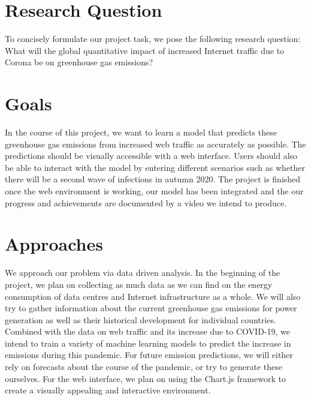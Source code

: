 \documentclass[s=english,inputenc=utf8,fontsize=10pt]{ldvarticle}
\begin{document}
\section*{Research Question}

To concisely formulate our project task, we pose the following research question:
What will the global quantitative impact of increased Internet traffic due to Corona be on greenhouse gas emissions?

\section*{Goals}

In the course of this project, we want to learn a model that predicts these greenhouse gas emissions from increased web traffic as accurately as possible. The predictions should be visually accessible with a web interface. Users should also be able to interact with the model by entering different scenarios such as whether there will be a second wave of infections in autumn 2020. The project is finished once the web environment is working, our model has been integrated and the our progress and achievements are documented by a video we intend to produce.

\section*{Approaches}

We approach our problem via data driven analysis. In the beginning of the project, we plan on collecting as much data as we can find on the energy consumption of data centres and Internet infrastructure as a whole. We will also try to gather information about the current greenhouse gas emissions for power generation as well as their historical development for individual countries. Combined with the data on web traffic and its increase due to COVID-19, we intend to train a variety of machine learning models to predict the increase in emissions during this pandemic. For future emission predictions, we will either rely on forecasts about the course of the pandemic, or try to generate these ourselves.
For the web interface, we plan on using the Chart.js framework to create a visually appealing and interactive environment.
\end{document}

